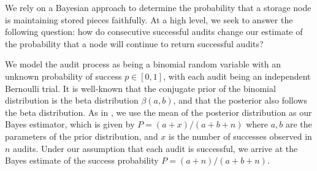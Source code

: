 We rely on a Bayesian approach to determine the probability
that a storage node is maintaining stored pieces faithfully.
At a high level, we seek to answer the following question:
how do consecutive successful audits change our estimate of
the probability that a node will continue to return successful audits?

We model the audit process as being a binomial random variable
with an unknown probability of success $p\in[0,1]$, with each audit
being an independent Bernoulli trial.
It is well-known that the conjugate prior of the binomial distribution
is the beta distribution $\beta(a,b)$,
and that the posterior also follows the beta distribution.
As in \cite{tumor-occurrence},
we use the mean of the posterior distribution as our Bayes
estimator, which is given by $P=(a+x)/(a+b+n)$ where $a,b$ are the parameters of
the prior distribution, and $x$ is the number of successes observed in $n$ audits.
Under our assumption that each audit is successful,
we arrive at the Bayes estimate of the success probability $P=(a+n)/(a+b+n)$.

